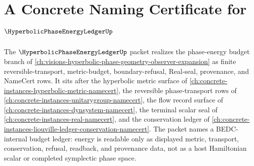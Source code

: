 \chapter{A Concrete Naming Certificate for $\HyperbolicPhaseEnergyLedgerUp$}
\label{ch:concrete-instances-hyperbolic-phase-energy-ledger-namecert}

The $\HyperbolicPhaseEnergyLedgerUp$ packet realizes the phase-energy budget branch of \autoref{ch:visions-hyperbolic-phase-geometry-observer-expansion} as finite reversible-transport, metric-budget, boundary-refusal, Real-seal, provenance, and NameCert rows. It sits after the hyperbolic metric surface of \autoref{ch:concrete-instances-hyperbolic-metric-namecert}, the reversible phase-transport rows of \autoref{ch:concrete-instances-unitarygroup-namecert}, the flow record surface of \autoref{ch:concrete-instances-dynsystem-namecert}, the terminal scalar seal of \autoref{ch:concrete-instances-real-namecert}, and the conservation ledger of \autoref{ch:concrete-instances-liouville-ledger-conservation-namecert}. The packet names a BEDC-internal budget ledger: energy is readable only as displayed metric, transport, conservation, refusal, readback, and provenance data, not as a host Hamiltonian scalar or completed symplectic phase space.

